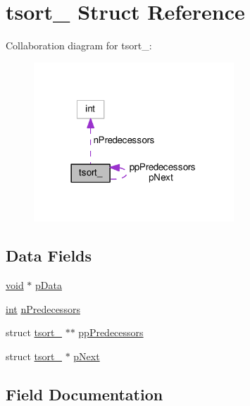 \hypertarget{structtsort__}{}\section{tsort\+\_\+ Struct Reference}
\label{structtsort__}


Collaboration diagram for tsort\+\_\+\+:
\nopagebreak
\begin{figure}[H]
\begin{center}
\leavevmode
\includegraphics[width=213pt]{structtsort____coll__graph}
\end{center}
\end{figure}
\subsection*{Data Fields}
\begin{DoxyCompactItemize}
\item 
\hyperlink{group__MOD__ISAPI_gacd6cdbf73df3d9eed42fa493d9b621a6}{void} $\ast$ \hyperlink{structtsort___a472f25d045aa66a6c4dd89a01fd275e7}{p\+Data}
\item 
\hyperlink{pcre_8txt_a42dfa4ff673c82d8efe7144098fbc198}{int} \hyperlink{structtsort___a0d9e22e0ca2b5397322d2a640ebb9bdf}{n\+Predecessors}
\item 
struct \hyperlink{structtsort__}{tsort\+\_\+} $\ast$$\ast$ \hyperlink{structtsort___a03fe4cb59a9556bd7cfa0ba9701e0b7b}{pp\+Predecessors}
\item 
struct \hyperlink{structtsort__}{tsort\+\_\+} $\ast$ \hyperlink{structtsort___a7c49d796ff9551e6cdb05f12f4d56fc6}{p\+Next}
\end{DoxyCompactItemize}


\subsection{Field Documentation}
